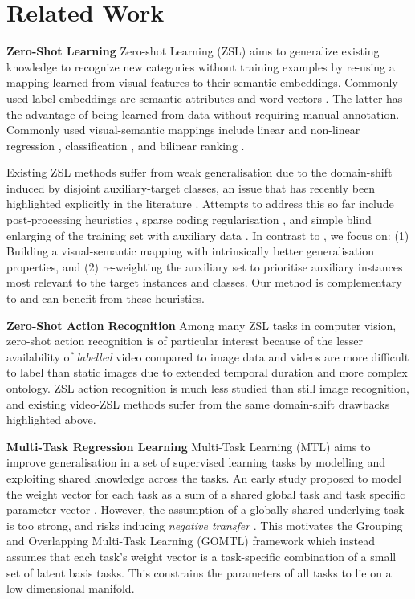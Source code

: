 \documentclass[runningheads]{llncs}
\begin{document}
\section{Related Work}
\noindent\textbf{Zero-Shot Learning}\quad
Zero-shot Learning (ZSL) \cite{Lampert2009} aims to generalize
existing knowledge to recognize new categories without training
examples by re-using a mapping learned from visual features to their
semantic embeddings. Commonly used label embeddings are semantic
attributes \cite{Lampert2009,Liu2011,Fu2015} and word-vectors
\cite{Socher2013,Xu2015}. The latter has the advantage of being
learned from data without requiring manual annotation. Commonly used
visual-semantic mappings include linear \cite{dinu2014improving} and non-linear
regression \cite{Fu2015,Socher2013,Xu2015}, classification
\cite{Lampert2009,Liu2011}, and bilinear ranking \cite{Akata2015}.  

Existing ZSL methods suffer from weak generalisation due to the
domain-shift induced by disjoint auxiliary-target classes, an issue that
has recently been highlighted explicitly in the literature
\cite{FuXKG_CVPR15,Fu2015,dinu2014improving,Lazaridou2014}. Attempts to address this so far include post-processing heuristics
\cite{Fu2015,dinu2014improving,Lazaridou2014}, sparse coding regularisation
\cite{FuXKG_CVPR15}, and simple blind enlarging of the training set
 with auxiliary data \cite{Xu2015}.  In contrast to \cite{FuXKG_CVPR15,Xu2015}, we focus
on: (1) Building a visual-semantic mapping with intrinsically better
generalisation properties, and (2) re-weighting the auxiliary set to
prioritise  auxiliary instances most relevant to the target
instances and classes. Our method is complementary to \cite{Fu2015,dinu2014improving}
and can benefit from these heuristics.

\noindent\textbf{Zero-Shot Action Recognition}\quad
Among many ZSL tasks in computer vision, zero-shot action recognition
\cite{Liu2011,Xu2015,Kodirov2015,gan2016recognizing,chang2016dynamic} is of particular interest because of
the lesser availability of {\em labelled} video compared to image
data and videos are more difficult to label than static
images due to extended temporal duration and more complex ontology.
ZSL action recognition is much less studied than still
image recognition, and existing video-ZSL methods suffer from the same
domain-shift drawbacks highlighted above. 

\noindent\textbf{Multi-Task Regression Learning}\quad
Multi-Task Learning (MTL) \cite{Pan2010,Yang2015} aims to improve
generalisation in a set of supervised learning tasks by
modelling and exploiting  shared knowledge across the tasks.
An early study \cite{Evgeniou2004} proposed to model
the weight vector for each task  as a sum of a shared global task
 and task specific parameter vector
. However, the assumption of a globally shared
underlying task is too strong, and risks inducing {\em negative transfer}
\cite{Pan2010}. This motivates the Grouping and Overlapping
Multi-Task Learning (GOMTL)  \cite{Kumar2012} framework which instead assumes that each
task's weight vector is a task-specific combination of a small set
of latent basis tasks. This constrains the parameters of all tasks to
lie on a low dimensional manifold.
\end{document}
